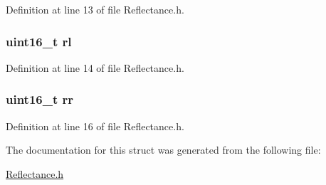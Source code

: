 Definition at line 13 of file Reflectance.\+h.

\subsubsection[{\texorpdfstring{rl}{rl}}]{\setlength{\rightskip}{0pt plus 5cm}uint16\+\_\+t rl}\hypertarget{structsensors___a55f8b53aee5b41e8af88a816fab2b70b}{}\label{structsensors___a55f8b53aee5b41e8af88a816fab2b70b}


Definition at line 14 of file Reflectance.\+h.

\subsubsection[{\texorpdfstring{rr}{rr}}]{\setlength{\rightskip}{0pt plus 5cm}uint16\+\_\+t rr}\hypertarget{structsensors___a6988d1a89f109b3f8d0e06547a5362f6}{}\label{structsensors___a6988d1a89f109b3f8d0e06547a5362f6}


Definition at line 16 of file Reflectance.\+h.



The documentation for this struct was generated from the following file\+:\begin{DoxyCompactItemize}
\item 
\hyperlink{_reflectance_8h}{Reflectance.\+h}\end{DoxyCompactItemize}
